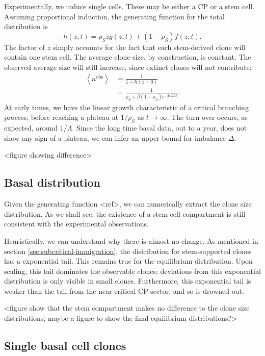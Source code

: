 \documentclass[10pt,UKenglish]{article}
\begin{document}
Experimentally, we induce single cells. These may be either a CP or a stem cell.
Assuming proportional induction, the generating function for the total
distribution is $$h(z,t) = \rho_S z g(z,t) + (1-\rho_S) f(z,t).$$ The factor of
$z$ simply accounts for the fact that each stem-derived clone will contain one
stem cell. The average clone size, by construction, is constant. The observed
average size will still increase, since extinct clones will not contribute: 
\begin{align*}
\left\langle n^\textrm{obs} \right\rangle &= \frac{1}{1 - h(z=0)} \\
  &= \frac{1}{\rho_S + \beta (1-\rho_S) e^{-2 r \Delta \lambda t}}.
\end{align*}
At early times, we have the linear growth characteristic of a critical branching
process, before reaching a plateau at $1/\rho_S$ as $t\rightarrow\infty$. The
turn over occurs, as expected, around $1/\Lambda$. Since the long time basal
data, out to a year, does not show any sign of a plateau, we can infer an upper
bound for imbalance $\Delta$.

<figure showing difference>

\subsection{Basal distribution}

Given the generating function <ref>, we can numerically extract the clone size
distribution. As we shall see, the existence of a stem cell compartment is still
consistent with the experimental observations.

Heuristically, we can understand why there is almost no change. As mentioned in
section \ref{sec:subcritical-immigration}, the distribution for stem-supported
clones has a exponential tail. This remains true for the equilibrium
distribution. Upon scaling, this tail dominates the observable clones;
deviations from this exponential distribution is only visible in small clones.
Furthermore, this exponential tail is weaker than the tail from the near
critical CP sector, and so is drowned out.

<figure show that the stem compartment makes no difference to the clone size
distributions; maybe a figure to show the final equilibrium distributions?>

\subsection{\label{sec:single-cells}Single basal cell clones}
\end{document}
